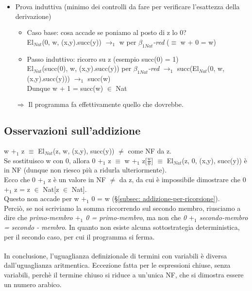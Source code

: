\noindent
\normalsize
\begin{itemize}
\item Prova induttiva (minimo dei controlli da fare per verificare l'esattezza della derivazione)
\begin{itemize}
\item Caso base: cosa accade se poniamo al posto di z lo 0?\\
El$_{Nat}$(0, w, (x,y).succ(y)) $\rightarrow_1$ w per \textit{$\beta_{1Nat}$-red} ($\equiv$ w + 0 = w)
\item Passo induttivo: ricorro su z (esempio succ(0) = 1)\\
El$_{Nat}$(succ(0), w, (x,y).succ(y)) per \textit{$\beta_{1Nat}$-red} $\rightarrow_1$ succ(El$_{Nat}$(0, w, (x,y).succ(y))) $\rightarrow_1$ succ(w) \\
Dunque w + 1 = succ(w) $\in$ Nat
\end{itemize}
\noindent
$\Rightarrow$ Il programma fa effettivamente quello che dovrebbe.
\end{itemize}

\subsection{Osservazioni sull'addizione}
\label{subsubsec: osservazioni-addizione}
w $+_1$ z $\equiv$ El$_{Nat}$(z, w, (x,y), succ(y)) $\neq$ come NF da z.\\
Se sostituisco w con 0, allora 0 $+_1$ z $\equiv$ w $+_1$ z[$\frac{w}{0}$] $\equiv$ El$_{Nat}$(z, 0, (x,y), succ(y)) \`e in NF (dunque non riesco pi\`u a ridurla ulteriormente). 
\\Ecco che 0 $+_1$ z \`e un valore in NF $\neq$ da z, da cui \`e impossibile dimostrare che 0 $+_1$ z = z $\in$ Nat[z $\in$ Nat].\\
Questo non accade per w $+_1$ 0 = w (\S \ref{subsec: addizione-per-ricorsione}).\\ 
Perci\`o, se noi scriviamo la somma riccorrendo sul secondo membro, riusciamo a dire che \textit{primo-membro $+_1$ 0 = primo-membro}, ma non che \textit{0 $+_1$ secondo-membro = secondo - membro}. In quanto non esiste alcuna sottostrategia deterministica, per il secondo caso, per cui il programma si ferma.
\\\\
In conclusione, l'uguaglianza definizionale di termini con variabili \`e diversa dall'uguaglianza aritmentica. Eccezione fatta per le espressioni chiuse, senza variabili, perch\`e il termine chiuso si riduce a un'unica NF, che si dimostra essere un numero arabico.

